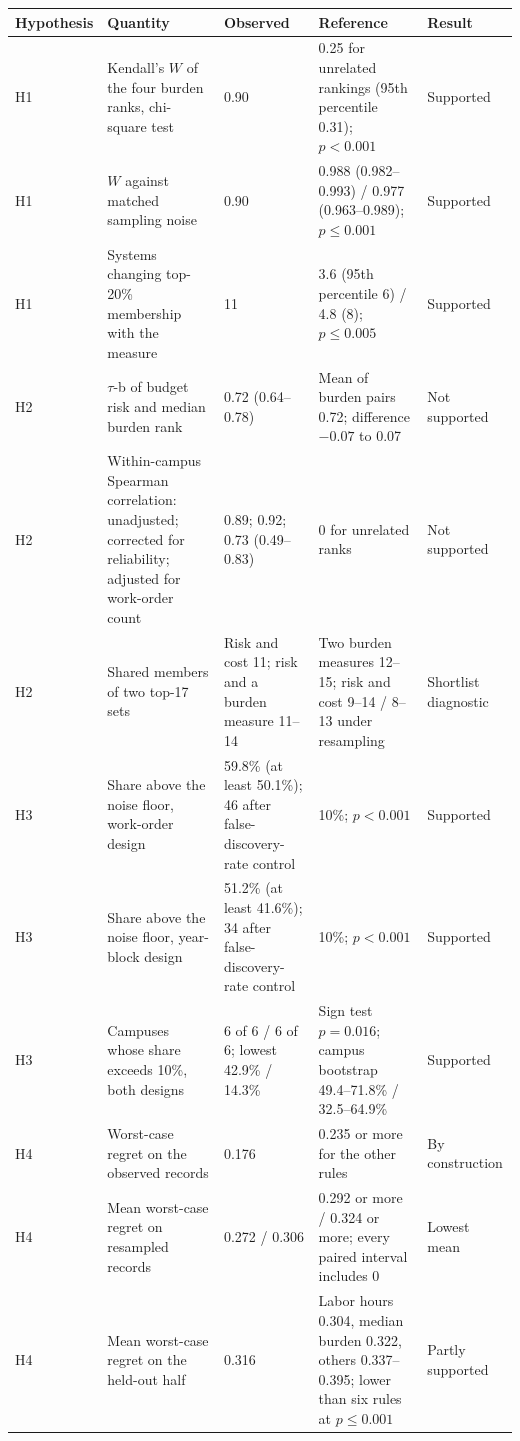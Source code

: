\begin{tabular}{lp{4.4cm}p{3.0cm}p{5.0cm}p{2.0cm}}
\toprule
Hypothesis & Quantity & Observed & Reference & Result \\
\midrule
H1 & Kendall's $W$ of the four burden ranks, chi-square test & 0.90 & 0.25 for unrelated rankings (95th percentile 0.31); $p < 0.001$ & Supported \\
H1 & $W$ against matched sampling noise & 0.90 & 0.988 (0.982--0.993) / 0.977 (0.963--0.989); $p \leq 0.001$ & Supported \\
H1 & Systems changing top-20\% membership with the measure & 11 & 3.6 (95th percentile 6) / 4.8 (8); $p \leq 0.005$ & Supported \\
H2 & $\tau$-b of budget risk and median burden rank & 0.72 (0.64--0.78) & Mean of burden pairs 0.72; difference $-0.07$ to 0.07 & Not supported \\
H2 & Within-campus Spearman correlation: unadjusted; corrected for reliability; adjusted for work-order count & 0.89; 0.92; 0.73 (0.49--0.83) & 0 for unrelated ranks & Not supported \\
H2 & Shared members of two top-17 sets & Risk and cost 11; risk and a burden measure 11--14 & Two burden measures 12--15; risk and cost 9--14 / 8--13 under resampling & Shortlist diagnostic \\
H3 & Share above the noise floor, work-order design & 59.8\% (at least 50.1\%); 46 after false-discovery-rate control & 10\%; $p < 0.001$ & Supported \\
H3 & Share above the noise floor, year-block design & 51.2\% (at least 41.6\%); 34 after false-discovery-rate control & 10\%; $p < 0.001$ & Supported \\
H3 & Campuses whose share exceeds 10\%, both designs & 6 of 6 / 6 of 6; lowest 42.9\% / 14.3\% & Sign test $p = 0.016$; campus bootstrap 49.4--71.8\% / 32.5--64.9\% & Supported \\
H4 & Worst-case regret on the observed records & 0.176 & 0.235 or more for the other rules & By construction \\
H4 & Mean worst-case regret on resampled records & 0.272 / 0.306 & 0.292 or more / 0.324 or more; every paired interval includes 0 & Lowest mean \\
H4 & Mean worst-case regret on the held-out half & 0.316 & Labor hours 0.304, median burden 0.322, others 0.337--0.395; lower than six rules at $p \leq 0.001$ & Partly supported \\
\bottomrule
\end{tabular}
